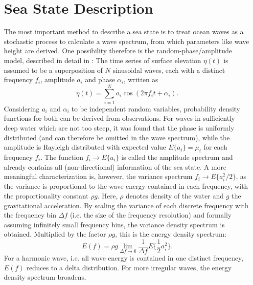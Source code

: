 \section{Sea State Description}
The most important method 
to describe a sea state is to treat ocean waves as a stochastic process to 
calculate a wave spectrum, from which parameters like wave height are derived. 
One possibility therefore is the random-phase/amplitude model, described in 
detail in \cite{holthuijsen2007}: The time series of surface elevation $ \eta 
(t)$ is assumed to be a superposition of $N$ sinusoidal waves, each with a 
distinct frequency $f_i$, amplitude $a_i$ and phase $\alpha_i$, written as
\begin{equation}
 \label{sinussum}
 \eta(t) = \sum_{i=1}^N a_i \cos (2\pi f_i t + \alpha_i).
\end{equation}
Considering $a_i$ and $\alpha_i$ to be independent random variables, 
probability density functions for both can be derived from observations. For 
waves in sufficiently deep water which are not too steep, it was found that the 
phase is uniformly distributed (and can therefore be omitted in the wave 
spectrum), while the amplitude is Rayleigh distributed with expected value 
$E\{a_i\} = \mu_i$ for each frequency $f_i$. The function $f_i \rightarrow 
E\{a_i\}$ is called the amplitude spectrum and already contains all 
(non-directional) information of the sea state. A more meaningful 
characterization is, however, the variance spectrum $f_i \rightarrow E\{a_i^2 
\slash 2\}$, as the variance is proportional to the wave energy contained in 
each frequency, with the proportionality constant $\rho g$. Here, $\rho$ 
denotes 
density of the water and $g$ the gravitational acceleration. By scaling the 
variance of each discrete frequency with the frequency bin $\Delta f$ (i.e. the 
size of the frequency resolution) and formally assuming infinitely small 
frequency bins, the variance density spectrum is obtained. Multiplied by the 
factor $\rho g$, this is the energy density spectrum:
\begin{equation}
 \label{vardensspec}
 E(f) = \rho g \lim_{\Delta f \rightarrow 0} \frac{1}{\Delta f} E\{\frac{1}{2} 
a_i^2\}.
\end{equation}
For a harmonic wave, i.e. all wave energy is contained in one distinct 
frequency, $E(f)$ reduces to a delta distribution. For more irregular waves, 
the 
energy density spectrum broadens. 


